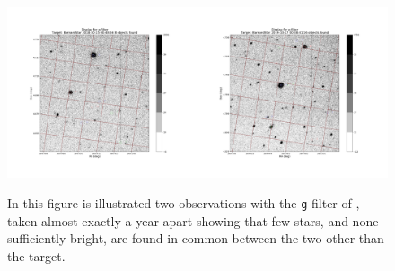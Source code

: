 \begin{figure}[!htbp]
\begin{center}
\includegraphics[scale=0.25]{images/yearapart.png} \\
\end{center}   
\caption{In this figure is illustrated two observations with the \texttt{g}
filter of \bstar, taken almost exactly a year apart showing that few
stars, and none sufficiently bright, are found in common between the two other
than the target.}
\protect\label{fig:yearapart}
\end{figure}

\clearpage
